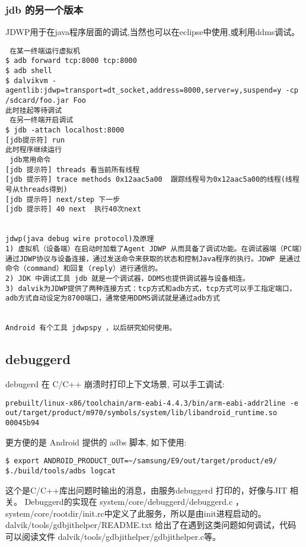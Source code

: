 \documentclass[a4paper,titlepage]{article}
\begin{document}
\subsubsection{jdb 的另一个版本}
JDWP用于在java程序层面的调试,当然也可以在eclipse中使用,或利用ddms调试。
\begin{verbatim}
 在某一终端运行虚拟机
$ adb forward tcp:8000 tcp:8000
$ adb shell
$ dalvikvm -agentlib:jdwp=transport=dt_socket,address=8000,server=y,suspend=y -cp /sdcard/foo.jar Foo
此时挂起等待调试
 在另一终端开启调试
$ jdb -attach localhost:8000
[jdb提示符] run
此时程序继续运行
 jdb常用命令
[jdb 提示符] threads 看当前所有线程
[jdb 提示符] trace methods 0x12aac5a00  跟踪线程号为0x12aac5a00的线程(线程号从threads得到)
[jdb 提示符] next/step 下一步
[jdb 提示符] 40 next  执行40次next


jdwp(java debug wire protocol)及原理
1) 虚拟机（设备端）在启动时加载了Agent JDWP 从而具备了调试功能。在调试器端（PC端）通过JDWP协议与设备连接，通过发送命令来获取的状态和控制Java程序的执行。JDWP 是通过命令（command）和回复（reply）进行通信的。
2) JDK 中调试工具 jdb 就是一个调试器，DDMS也提供调试器与设备相连。
3) dalvik为JDWP提供了两种连接方式：tcp方式和adb方式，tcp方式可以手工指定端口，adb方式自动设定为8700端口，通常使用DDMS调试就是通过adb方式


Android 有个工具 jdwpspy ，以后研究如何使用。

\end{verbatim}


\subsection{debuggerd}
debugerd  在 C/C++ 崩溃时打印上下文场景, 可以手工调试:
\begin{lstlisting} 
prebuilt/linux-x86/toolchain/arm-eabi-4.4.3/bin/arm-eabi-addr2line -e out/target/product/m970/symbols/system/lib/libandroid_runtime.so 00045b94
\end{lstlisting}

更方便的是 Android 提供的 adbs 脚本, 如下使用:
\begin{lstlisting} 
$ export ANDROID_PRODUCT_OUT=~/samsung/E9/out/target/product/e9/
$./build/tools/adbs logcat 
\end{lstlisting}

这个是C/C++库出问题时输出的消息，由服务debuggerd 打印的，好像与JIT 相关。
Debuggerd的实现在 system/core/debuggerd/debuggerd.c
，system/core/rootdir/init.rc中定义了此服务，所以是由init进程启动的。
dalvik/tools/gdbjithelper/README.txt
给出了在遇到这类问题如何调试，代码可以阅读文件
dalvik/tools/gdbjithelper/gdbjithelper.c等。
\end{document}
